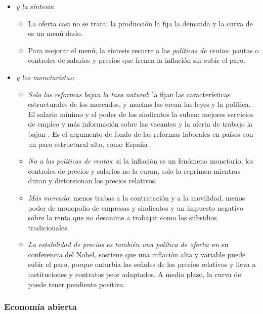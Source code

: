 \documentclass[11pt]{article}
\begin{document}
\begin{itemize}
\item \emph{ y la síntesis}:
  \begin{itemize}
  \item La oferta casi no se trata: la producción la fija la demanda y la curva de  es un menú dado.
  \item Para mejorar el menú, la síntesis recurre a las \emph{políticas de rentas}: pautas o controles de salarios y precios que frenen la inflación sin subir el paro.
  \end{itemize}
\item \emph{ y los monetaristas}:
  \begin{itemize}
  \item \emph{Solo las reformas bajan la tasa natural}: la fijan las características estructurales de los mercados, y muchas las crean las leyes y la política. El salario mínimo y el poder de los sindicatos la suben; mejores servicios de empleo y más información sobre las vacantes y la oferta de trabajo la bajan\nocite{Friedman1968Role} . Es el argumento de fondo de las reformas laborales en países con un paro estructural alto, como España .
  \item \emph{No a las políticas de rentas}: si la inflación es un fenómeno monetario, los controles de precios y salarios no la curan, solo la reprimen mientras duran y distorsionan los precios relativos\nocite{SnowdonVane2005Modern}.
  \item \emph{Más mercado}: menos trabas a la contratación y a la movilidad, menos poder de monopolio de empresas y sindicatos y un impuesto negativo sobre la renta que no desanime a trabajar como los subsidios tradicionales\nocite{Friedman1962Capitalism}.
  \item \emph{La estabilidad de precios es también una política de oferta}: en su conferencia del Nobel, \textcite{Friedman1977Nobel} sostiene que una inflación alta y variable puede subir el paro, porque enturbia las señales de los precios relativos y lleva a instituciones y contratos peor adaptados. A medio plazo, la curva de  puede tener pendiente positiva.
  \end{itemize}
\end{itemize}

\subsubsection{Economía abierta}\label{sec:economia-abierta}
\end{document}
